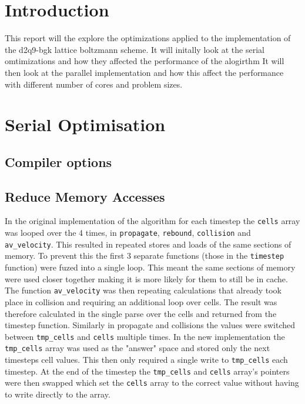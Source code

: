 \documentclass{article}
\begin{document}
\begin{multicols}{2}

\section{Introduction}

This report will the explore the optimizations applied to the implementation of
the d2q9-bgk lattice boltzmann scheme. It will initally look at the serial
omtimizations and how they affected the performance of the alogirthm It will
then look at the parallel implementation and how this affect the performance
with different number of cores and problem sizes.

\section{Serial Optimisation}

\subsection{Compiler options}

\subsection{Reduce Memory Accesses}

In the original implementation of the algorithm for each timestep the
\verb|cells| array was looped over the 4 times, in \verb|propagate|,
\verb|rebound|, \verb|collision| and \verb|av_velocity|. This resulted in
repeated stores and loads of the same sections of memory. To prevent this the
first 3 separate functions (those in the \verb|timestep| function) were fuzed
into a single loop. This meant the same sections of memory were used closer
together making it is more likely for them to still be in cache. The function
\verb|av_velocity| was then repeating calculations that already took place in
collision and requiring an additional loop over cells. The result was therefore
calculated in the single parse over the cells and returned from the timestep
function. Similarly in propagate and collisions the values were switched
between \verb|tmp_cells| and \verb|cells| multiple times. In the new
implementation the \verb|tmp_cells| array was used as the "answer" space and
stored only the next timesteps cell values. This then only required a single
write to \verb|tmp_cells| each timestep. At the end of the timestep the
\verb|tmp_cells| and \verb|cells| array's pointers were then swapped which set
the \verb|cells| array to the correct value without having to write directly to
the array.


\end{multicols}
\end{document}
